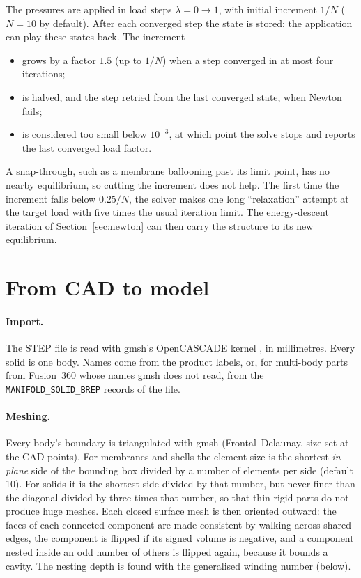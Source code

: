 \documentclass[11pt,a4paper]{article}
\newcommand{\code}[1]{\texttt{#1}}
\theoremstyle{remark}
\begin{document}
The pressures are applied in load steps $\lambda = 0 \to 1$, with initial increment $1/N$
($N=10$ by default). After each converged step the state is stored; the application can play
these states back. The increment
\begin{itemize}[noitemsep]
\item grows by a factor $1.5$ (up to $1/N$) when a step converged in at most four iterations;
\item is halved, and the step retried from the last converged state, when Newton fails;
\item is considered too small below $10^{-3}$, at which point the solve stops and reports the
      last converged load factor.
\end{itemize}
A snap-through, such as a membrane ballooning past its limit point, has no nearby equilibrium, so
cutting the increment does not help. The first time the increment falls below $0.25/N$, the
solver makes one long ``relaxation'' attempt at the target load with five times the usual
iteration limit. The energy-descent iteration of Section~\ref{sec:newton} can then carry the
structure to its new equilibrium.

\section{From CAD to model}\label{sec:cad}

\paragraph{Import.} The STEP file is read with gmsh's OpenCASCADE kernel \cite{geuzaine2009}, in
millimetres. Every solid is one body. Names come from the product labels, or, for multi-body parts
from Fusion~360 whose names gmsh does not read, from the \code{MANIFOLD\_SOLID\_BREP} records of the
file.

\paragraph{Meshing.} Every body's boundary is triangulated with gmsh (Frontal--Delaunay, size set at
the CAD points). For membranes and shells the element size is the shortest \emph{in-plane} side of
the bounding box divided by a number of elements per side (default 10). For solids it is the
shortest side divided by that number, but never finer than the diagonal divided by three times
that number, so that thin rigid parts do not produce huge meshes. Each closed surface mesh is then
oriented outward: the faces of each connected component are made consistent by walking across
shared edges, the component is flipped if its signed volume is negative, and a component nested
inside an odd number of others is flipped again, because it bounds a cavity. The nesting depth is
found with the generalised winding number (below).
\end{document}
